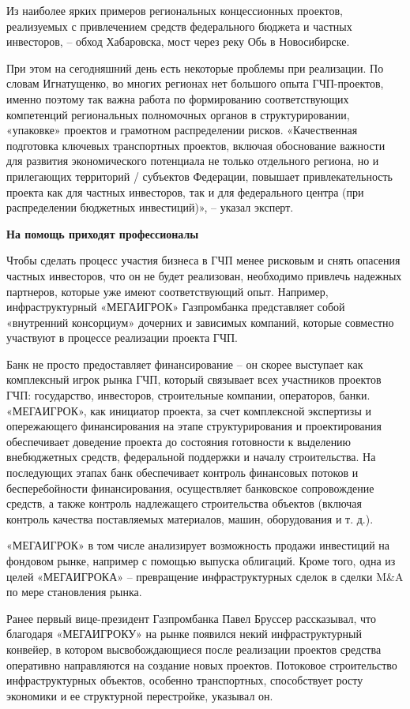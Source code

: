 Из наиболее ярких примеров региональных концессионных проектов, реализуемых с привлечением средств федерального бюджета и частных инвесторов, – обход Хабаровска, мост через реку Обь в Новосибирске.

При этом на сегодняшний день есть некоторые проблемы при реализации. По словам Игнатущенко, во многих регионах нет большого опыта ГЧП-проектов, именно поэтому так важна работа по формированию соответствующих компетенций региональных полномочных органов в структурировании, «упаковке» проектов и грамотном распределении рисков. «Качественная подготовка ключевых транспортных проектов, включая обоснование важности для развития экономического потенциала не только отдельного региона, но и прилегающих территорий / субъектов Федерации, повышает привлекательность проекта как для частных инвесторов, так и для федерального центра (при распределении бюджетных инвестиций)», – указал эксперт.


\textbf{На помощь приходят профессионалы}

Чтобы сделать процесс участия бизнеса в ГЧП менее рисковым и снять опасения частных инвесторов, что он не будет реализован, необходимо привлечь надежных партнеров, которые уже имеют соответствующий опыт. Например, инфраструктурный «МЕГАИГРОК» Газпромбанка представляет собой «внутренний консорциум» дочерних и зависимых компаний, которые совместно участвуют в процессе реализации проекта ГЧП.

Банк не просто предоставляет финансирование – он скорее выступает как комплексный игрок рынка ГЧП, который связывает всех участников проектов ГЧП: государство, инвесторов, строительные компании, операторов, банки. «МЕГАИГРОК», как инициатор проекта, за счет комплексной экспертизы и опережающего финансирования на этапе структурирования и проектирования обеспечивает доведение проекта до состояния готовности к выделению внебюджетных средств, федеральной поддержки и началу строительства. На последующих этапах банк обеспечивает контроль финансовых потоков и бесперебойности финансирования, осуществляет банковское сопровождение средств, а также контроль надлежащего строительства объектов (включая контроль качества поставляемых материалов, машин, оборудования и т. д.).

«МЕГАИГРОК» в том числе анализирует возможность продажи инвестиций на фондовом рынке, например с помощью выпуска облигаций. Кроме того, одна из целей «МЕГАИГРОКА» – превращение инфраструктурных сделок в сделки M\&A по мере становления рынка.

Ранее первый вице-президент Газпромбанка Павел Бруссер рассказывал, что благодаря «МЕГАИГРОКУ» на рынке появился некий инфраструктурный конвейер, в котором высвобождающиеся после реализации проектов средства оперативно направляются на создание новых проектов. Потоковое строительство инфраструктурных объектов, особенно транспортных, способствует росту экономики и ее структурной перестройке, указывал он.


